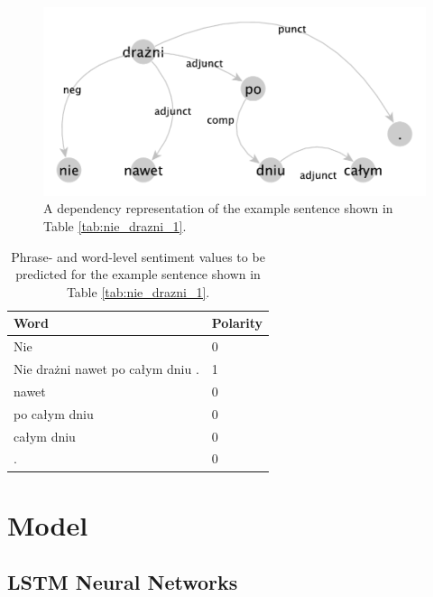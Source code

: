 \documentclass[10pt, a4paper]{article}
\begin{document}
\begin{figure}
  \includegraphics[width=\linewidth]{imgs/nie_drazni.pdf}
  \caption{A dependency representation of the example sentence shown in Table \ref{tab:nie_drazni_1}.}
  \label{fig:dep_sent}
\end{figure}

\begin{table}[h]
 \begin{center}
\begin{tabular}{|l | l|}

\hline
 Word &	Polarity\\
      \hline
     Nie &	0\\
     \hline
Nie drażni nawet po całym dniu	 . & 1\\
\hline
nawet &	0\\
\hline
po całym dniu &	0\\
\hline
całym dniu &	0\\
\hline
.	& 0\\
      \hline
\end{tabular}
\caption{Phrase- and word-level sentiment values to be predicted for the example sentence shown in Table \ref{tab:nie_drazni_1}.}
\label{tab:nie_drazni_2}
 \end{center}
\end{table}






\section{Model} 


\subsection{LSTM Neural Networks}
\end{document}

